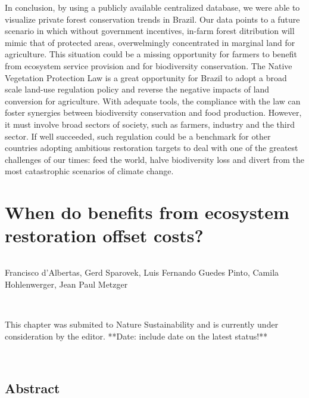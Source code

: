 \documentclass[
	12pt,				%
	oneside,			%
	a4paper,			%
	chapter=TITLE,		%
	section=TITLE,		%
	brazil,			%
	english				%
	]{abntex2}
\begin{document}
In conclusion, by using a publicly available centralized database, we were able to visualize private forest conservation trends in Brazil. Our data points to a future scenario in which without government incentives, in-farm forest ditribution will mimic that of protected areas, overwelmingly concentrated in marginal land for agriculture. This situation could be a missing opportunity for farmers to benefit from ecosystem service provision and for biodiversity conservation. The Native Vegetation Protection Law is a great opportunity for Brazil to adopt a broad scale land-use regulation policy and reverse the negative impacts of land conversion for agriculture. With adequate tools, the compliance with the law can foster synergies between biodiversity conservation and food production. However, it must involve broad sectors of society, such as farmers, industry and the third sector. If well succeeded, such regulation could be a benchmark for other countries adopting ambitious restoration targets to deal with one of the greatest challenges of our times: feed the world, halve biodiversity loss and divert from the most catastrophic scenarios of climate change.

\hypertarget{when-do-benefits-from-ecosystem-restoration-offset-costs}{%
\chapter{When do benefits from ecosystem restoration offset costs?}\label{when-do-benefits-from-ecosystem-restoration-offset-costs}}

\(~\)
\begin{flushleft}

Francisco d’Albertas, Gerd Sparovek, Luis Fernando Guedes Pinto, 
Camila Hohlenwerger, Jean Paul Metzger 

\end{flushleft}
\(~\)
\(~\)
\begin{flushleft}

This chapter was submited to Nature Sustainability and is currently under 
consideration by the editor. **Date: include date on the latest status!**

\end{flushleft}
\(~\)
\(~\)

\hypertarget{abstract-1}{%
\section{Abstract}\label{abstract-1}}
\end{document}

